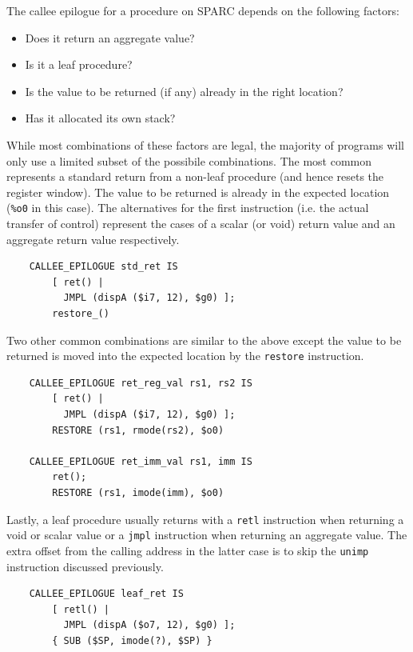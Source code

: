 The callee epilogue for a procedure on SPARC depends on the following
factors:

\begin{itemize}
\item Does it return an aggregate value?
\item Is it a leaf procedure?
\item Is the value to be returned (if any) already in the right
      location?
\item Has it allocated its own stack?
\end{itemize}

While most combinations of these factors are legal, the majority
of programs will only use a limited subset of the possibile
combinations.  The most common represents a standard return from
a non-leaf procedure (and hence resets the register window). The
value to be returned is already in the expected location ({\tt \%o0}
in this case). The alternatives for the first instruction (i.e. the
actual transfer of control) represent the cases of a scalar (or void)
return value and an aggregate return value respectively.

\begin{verbatim}
    CALLEE_EPILOGUE std_ret IS
        [ ret() |
          JMPL (dispA ($i7, 12), $g0) ];
        restore_()
\end{verbatim}

Two other common combinations are similar to the above except the
value to be returned is moved into the expected location by the
{\tt restore} instruction.

\begin{verbatim}
    CALLEE_EPILOGUE ret_reg_val rs1, rs2 IS
        [ ret() |
          JMPL (dispA ($i7, 12), $g0) ];
        RESTORE (rs1, rmode(rs2), $o0)

    CALLEE_EPILOGUE ret_imm_val rs1, imm IS
        ret();
        RESTORE (rs1, imode(imm), $o0)
\end{verbatim}

Lastly, a leaf procedure usually returns with a {\tt retl}
instruction when returning a void or scalar value or a {\tt jmpl}
instruction when returning an aggregate value. The extra offset from
the calling address in the latter case is to skip the {\tt unimp}
instruction discussed previously.

\begin{verbatim}
    CALLEE_EPILOGUE leaf_ret IS
        [ retl() |
          JMPL (dispA ($o7, 12), $g0) ];
        { SUB ($SP, imode(?), $SP) }
\end{verbatim}

